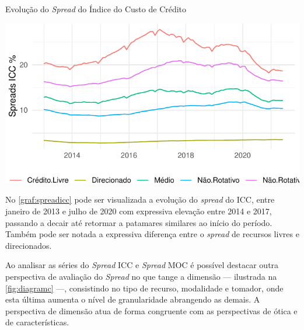 \documentclass[
  12pt,
  12pt,
  openright,
  oneside,
  a4paper,
  chapter=TITLE,
  section=TITLE,
  subsection=TITLE,
  subsubsection=TITLE,
  english,
  portugues,
  sumario=tradicional]{abntex2}
\begin{document}
\begin{grafico}[!htbp]
\vspace{20pt}
\caption{Evolução do \emph{Spread} do Índice do Custo de Crédito}
\vspace{-4mm}

\begin{center}\includegraphics{12-exportedfigures/spread 2019 icc-1} \end{center}
\vspace{-3mm}
\label{graf:spreadicc}
\vspace{-2mm}
\end{grafico}

No \autoref{graf:spreadicc} pode ser visualizada a evolução do \emph{spread} do ICC, entre janeiro de 2013 e julho de 2020 com expressiva elevação entre 2014 e 2017, passando a decair até retormar a patamares similares ao início do período. Também pode ser notada a expressiva diferença entre o \emph{spread} de recursos livres e direcionados.

Ao analisar as séries do \emph{Spread} ICC e \emph{Spread} MOC é possível destacar outra perspectiva de avaliação do \emph{Spread} no que tange a dimensão --- ilustrada na \autoref{fig:diagramc} ---, consistindo no tipo de recurso, modalidade e tomador, onde esta última aumenta o nível de granularidade abrangendo as demais. A perspectiva de dimensão atua de forma congruente com as perspectivas de ótica e de características.
\end{document}
